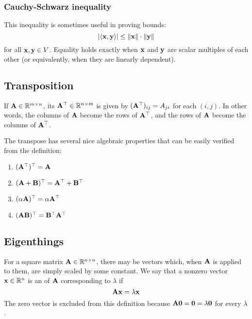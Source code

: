 \subsubsection{Cauchy-Schwarz inequality}
This inequality is sometimes useful in proving bounds:
\[|\langle \mathbf{x}, \mathbf{y} \rangle| \leq \|\mathbf{x}\| \cdot \|\mathbf{y}\|\]
for all $\mathbf{x}, \mathbf{y} \in V$. Equality holds exactly when $\mathbf{x}$ and $\mathbf{y}$ are scalar multiples of each other (or equivalently, when they are linearly dependent).

\subsection{Transposition}
If $\mathbf{A} \in \mathbb{R}^{m \times n}$, its  $\mathbf{A}^\top \in \mathbb{R}^{n \times m}$ is given by $(\mathbf{A}^\top)_{ij} = A_{ji}$ for each $(i, j)$.
In other words, the columns of $\mathbf{A}$ become the rows of $\mathbf{A}^\top$, and the rows of $\mathbf{A}$ become the columns of $\mathbf{A}^\top$.

The transpose has several nice algebraic properties that can be easily verified from the definition:
\begin{enumerate}
\item $(\mathbf{A}^\top)^\top = \mathbf{A}$
\item $(\mathbf{A}+\mathbf{B})^\top = \mathbf{A}^\top + \mathbf{B}^\top$
\item $(\alpha \mathbf{A})^\top = \alpha \mathbf{A}^\top$
\item $(\mathbf{A}\mathbf{B})^\top = \mathbf{B}^\top \mathbf{A}^\top$
\end{enumerate}

\subsection{Eigenthings}
For a square matrix $\mathbf{A} \in \mathbb{R}^{n \times n}$, there may be vectors which, when $\mathbf{A}$ is applied to them, are simply scaled by some constant.
We say that a nonzero vector $\mathbf{x} \in \mathbb{R}^n$ is an  of $\mathbf{A}$ corresponding to  $\lambda$ if
\[\mathbf{A}\mathbf{x} = \lambda\mathbf{x}\]
The zero vector is excluded from this definition because $\mathbf{A}\mathbf{0} = \mathbf{0} = \lambda\mathbf{0}$ for every $\lambda$.

